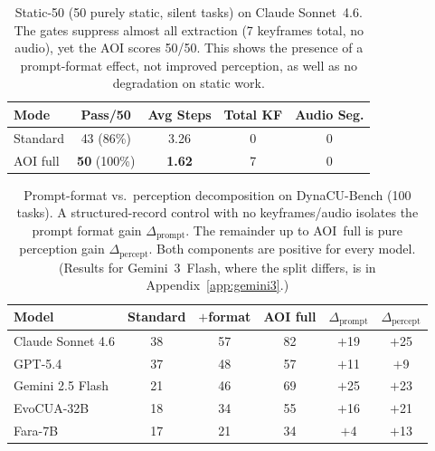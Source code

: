 \documentclass[11pt]{article}
\begin{document}
\begin{table}[!h]
\centering
\caption{Static-50 (50 purely static, silent tasks) on Claude Sonnet~4.6. The gates
suppress almost all extraction (7 keyframes total, no audio), yet the AOI scores
50/50. This shows the presence of a prompt-format effect, not improved perception, as well as no degradation on static work.}
\label{tab:static}
\small
\begin{tabular}{@{}l cc cc@{}}
\toprule
\textbf{Mode} & \textbf{Pass/50} & \textbf{Avg Steps} & \textbf{Total KF} & \textbf{Audio Seg.} \\
\midrule
Standard & 43 \scriptsize(86\%) & 3.26 & 0 & 0 \\
AOI full & \textbf{50} \scriptsize(100\%) & \textbf{1.62} & 7 & 0 \\
\bottomrule
\end{tabular}
\end{table}

\begin{table}[!h]
\centering
\caption{Prompt-format vs.\ perception decomposition on DynaCU-Bench (100 tasks).
A structured-record control with no keyframes/audio isolates the prompt format gain
$\Delta_\text{prompt}$. The remainder up to AOI~full is pure perception gain $\Delta_\text{percept}$.
Both components are positive for every model. (Results for Gemini~3~Flash, where the split differs, is in
Appendix~\ref{app:gemini3}.)}
\label{tab:structured}
\small
\setlength{\tabcolsep}{3.0pt}
\begin{tabular}{@{}l ccc cc@{}}
\toprule
\textbf{Model} & \textbf{Standard} & \textbf{$+$format} & \textbf{AOI full}
& \textbf{$\Delta_\text{prompt}$} & \textbf{$\Delta_\text{percept}$} \\
\midrule
Claude Sonnet 4.6   & 38 & 57 & 82 & $+$19 & $+$25 \\
GPT-5.4             & 37 & 48 & 57 & $+$11 & $+$9 \\
Gemini 2.5 Flash    & 21 & 46 & 69 & $+$25 & $+$23 \\
EvoCUA-32B          & 18 & 34 & 55 & $+$16 & $+$21 \\
Fara-7B             & 17 & 21 & 34 & $+$4  & $+$13 \\
\bottomrule
\end{tabular}
\end{table}
\end{document}
